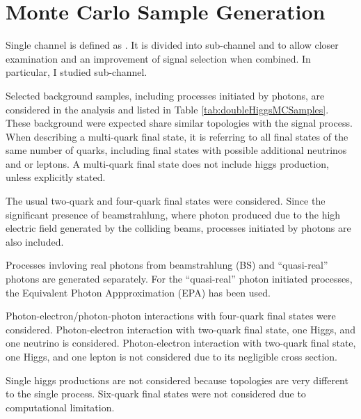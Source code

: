 \section{Monte Carlo Sample Generation}


Single channel is defined as \eeToHH. It is divided into sub-channel \eeToHHbbWW and \eeToHHbbbb to allow closer examination and an improvement of signal selection when combined. In particular, I studied \eeToHHbbWW sub-channel. 

Selected background samples, including processes initiated by photons, are considered in the analysis and listed in Table \ref{tab:doubleHiggsMCSamples}. These background were expected share similar topologies with the signal process. When describing a multi-quark final state, it is referring to  all final states of the same number of quarks, including final states with possible additional neutrinos and or leptons. A multi-quark final state does not include higgs production, unless explicitly stated.

The usual two-quark and four-quark final states were considered.
Since the significant presence of beamstrahlung, where photon produced due to the high electric field generated by the colliding beams, processes initiated by photons are also included.

Processes invloving real photons from beamstrahlung (BS) and ``quasi-real'' photons are generated separately. For the ``quasi-real'' photon initiated processes, the Equivalent Photon Appproximation (EPA) has been used.

Photon-electron/photon-photon interactions with four-quark final states were considered. Photon-electron interaction with two-quark final state, one Higgs, and one neutrino is considered. Photon-electron interaction with two-quark final state, one Higgs, and one lepton is not considered due to its negligible cross section.


Single higgs productions are not considered because topologies are very different to the single process.
Six-quark final states were not considered due to computational limitation.

